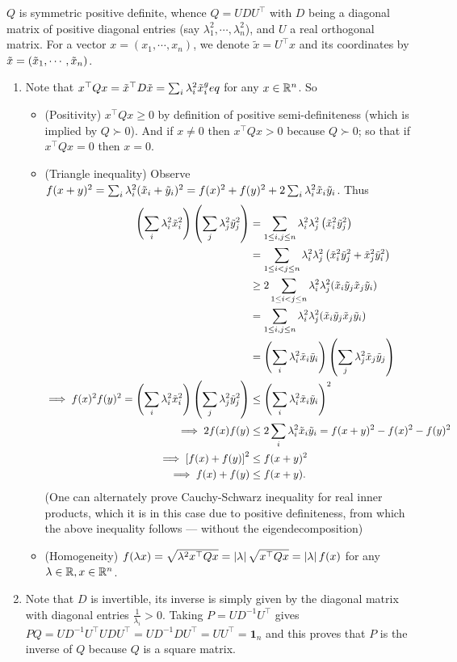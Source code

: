 \soln
$Q$ is symmetric positive definite, whence $Q=UDU^\top$ with $D$ being a diagonal matrix of positive diagonal entries (say $\lambda_1^2, \cdots,\lambda_n^2$), and $U$ a real orthogonal matrix. For a vector $x = (x_1,\cdots,x_n)$, we denote $\tilde x=U^\top x$ and its coordinates by ${\tilde{x}}=({\tilde{x}}_1,\cdots,{\tilde{x}}_n)$.
\begin{enumerate}[leftmargin=*]
\item Note that $x^\top Qx = {\tilde{x}}^\top D {\tilde{x}} = \sum_i \lambda_i^2{\tilde{x}}_i^geq$ for any $x\in\mathbb{R}^n$. So \begin{itemize}[leftmargin=*]
\item (Positivity) $x^\top Q x \geq 0$ by definition of positive semi-definiteness (which is implied by $Q\succ 0$). And if $x \neq 0$ then $x^\top Qx > 0$ because $Q\succ 0$; so that if $x^\top Q x=0$ then $x=0$.
\item (Triangle inequality) Observe $f(x+y)^2= \sum_i \lambda_i^2({\tilde{x}}_i+{\tilde{y}}_i)^2 = f(x)^2 + f(y)^2 + 2\sum_i \lambda_i^2{\tilde{x}}_i{\tilde{y}}_i$.
Thus \begin{align*}
\left(\sum_i\lambda_i^2{\tilde{x}}_i^2\right)\left(\sum_j\lambda_j^2{\tilde{y}}_j^2\right)
&=\sum_{1\leq i,j\leq n} \lambda_i^2\lambda_j^2 \left({\tilde{x}}_i^2{\tilde{y}}_j^2\right) \\
&= \sum_{1\leq i<j\leq n} \lambda_i^2\lambda_j^2 \left({\tilde{x}}_i^2{\tilde{y}}_j^2+{\tilde{x}}_j^2{\tilde{y}}_i^2\right)\\
&\geq 2\sum_{1\leq i<j\leq n} \lambda_i^2\lambda_j^2 ({\tilde{x}}_i{\tilde{y}}_j{\tilde{x}}_j{\tilde{y}}_i)\\
&= \sum_{1\leq i,j\leq n} \lambda_i^2\lambda_j^2 ({\tilde{x}}_i{\tilde{y}}_j{\tilde{x}}_j{\tilde{y}}_i)\\
&= \left(\sum_i\lambda_i^2{\tilde{x}}_i{\tilde{y}}_i\right)\left(\sum_j\lambda_j^2{\tilde{x}}_j{\tilde{y}}_j\right)\\
\implies f(x)^2f(y)^2 = \left(\sum_i\lambda_i^2{\tilde{x}}_i^2\right)\left(\sum_j\lambda_j^2{\tilde{y}}_j^2\right) &\leq \left(\sum_i\lambda_i^2{\tilde{x}}_i{\tilde{y}}_i\right)^2\\
\implies 2f(x)f(y)  &\leq 2\sum_i\lambda_i^2{\tilde{x}}_i{\tilde{y}}_i = f(x+y)^2-f(x)^2-f(y)^2\\
\implies \left[f(x) + f(y)\right]^2 &\leq f(x+y)^2\\
\implies f(x) + f(y) &\leq f(x+y).
\end{align*}
(One can alternately prove Cauchy-Schwarz inequality for real inner products, which it is in this case due to positive definiteness, from which the above inequality follows --- without the eigendecomposition)
\item (Homogeneity) $f(\lambda x) = \sqrt{\lambda^2 x^\top Qx} = \left| \lambda \right|\sqrt{x^\top Qx} = \left| \lambda \right| f(x)$ for any $\lambda\in\mathbb{R},x\in\mathbb{R}^n$.
\end{itemize}
\item  Note that $D$ is invertible, its inverse is simply given by the diagonal matrix with diagonal entries $\frac{1}{\lambda_i}>0$. Taking $P = UD^{-1}U^\top$ gives $PQ = UD^{-1}U^\top UDU^\top = UD^{-1}DU^\top = UU^\top = \pmb 1_n$ and this proves that $P$ is the inverse of $Q$ because $Q$ is a square matrix. 


\end{enumerate}
